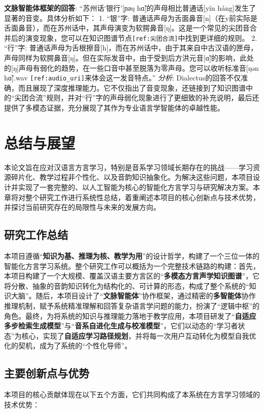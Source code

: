 \textbf{文脉智能体框架的回答}:
“苏州话‘银行’[ɲәŋ hɑ̃]的声母相比普通话[yín háng]发生了显著的音变。具体分析如下：
1.  “银”字: 普通话声母为舌面鼻音[n]（在y前实际是舌面鼻音），而在苏州话中，其声母演变为软腭鼻音[ŋ]。这是一个常见的尖团音合并后的演变现象，您可以在知识图谱节点\texttt{[ref:尖团合流]}中找到更详细的规则。
2.  “行”字: 普通话声母为舌根擦音[h]，而在苏州话中，由于其来自中古汉语的匣母，声母同样为软腭鼻音[ŋ]。但在实际发音中，由于受到后方洪元音[ɑ̃]的影响，此处的[ŋ]声母有弱化的趋势，在一些口音中甚至脱落为零声母。您可以收听标准音[ŋən hɑ̃].wav \texttt{[ref:audio\_uri]}来体会这一发音特点。”
\textit{分析}: Dialectus的回答不仅准确，而且展现了深度推理能力。它不仅指出了音变现象，还链接到了知识图谱中的“尖团合流”规则，并对“行”字的声母弱化现象进行了更细致的补充说明，最后还提供了多模态证据，充分展现了其作为专业语言学智能体的卓越性能。
\chapter{总结与展望}

本论文旨在应对汉语言方言学习，特别是音系学习领域长期存在的挑战——学习资源碎片化、教学过程非个性化、以及音韵知识抽象化。为解决这些问题，本项目设计并实现了一套完整的、以人工智能为核心的智能化方言学习与研究解决方案。本章将对整个研究工作进行系统性总结，着重阐述本项目的核心创新点与技术优势，并探讨当前研究存在的局限性与未来的发展方向。

\section{研究工作总结}
本项目遵循“\textbf{知识为基、推理为核、教学为用}”的设计哲学，构建了一个三位一体的智能化方言学习系统。整个研究工作可以概括为一个完整技术链路的构建：首先，本项目构建了一个大规模、覆盖汉语主要方言区的“\textbf{多模态方言声学知识图谱}”，它将分散、抽象的音韵知识转化为结构化的、可计算的形态，构成了整个系统的“知识大脑”。随后，本项目设计了“\textbf{文脉智能体}”协作框架，通过精密的\textbf{多智能体}协作推理机制，赋予系统精准理解和回答复杂语言学问题的能力，扮演了“逻辑中枢”的角色。最终，为将系统的知识与推理能力落地于教学应用，本项目研发了“\textbf{自适应多步检索生成模型}”与“\textbf{音系自进化生成与校准模型}”，它们以动态的“学习者状态”为核心，实现了\textbf{自适应学习路径规划}，并将每一次用户互动转化为模型自我优化的契机，成为了系统的“个性化导师”。

\section{主要创新点与优势}
本项目的核心贡献体现在以下五个方面，它们共同构成了本系统在方言学习领域的技术优势：

